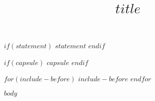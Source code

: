 \documentclass[$if(twocol)$twocol$endif$]{ametsocV5}
\title{$title$}
\affiliation{$affiliation$}
\begin{document}
\maketitle


%
%
$if(statement)$
\statement
$statement$
$endif$

$if(capsule)$
\capsule
$capsule$
$endif$

$for(include-before)$
$include-before$
$endfor$

%

$body$
\end{document}

